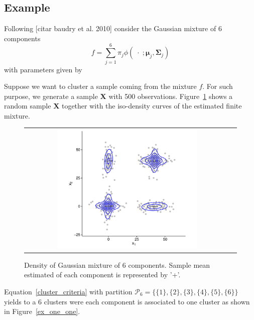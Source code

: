 \documentclass[10pt, a4paper]{article}
\newcommand{\m}[1]{\boldsymbol{#1}}
\begin{document}
\begin{spacing}{1.9}
\subsection{Example} \label{example}

Following [citar baudry et al. 2010] consider the Gaussian mixture of 6 components
\[
f= \sum_{j=1}^6 \pi_j \phi(\;\cdot\; ;  \m\mu_j, \m\Sigma_j)
\]
with parameters given by
{\small  }

Suppose we want to cluster a sample coming from the mixture $f$. For such purpose, we generate a sample \textbf{X} with 500 observations. Figure~\ref{ex_mixture} shows a random sample \textbf{X} together with the iso-density curves of the estimated finite mixture.

\begin{figure}[thbp]
\begin{center}
\begin{tabular}{cc}
  \includegraphics[width=0.7\textwidth]{figures/partition-example-mixture.pdf} \\
 \end{tabular}
 \caption{Density of Gaussian mixture of 6 components. Sample mean estimated of each component is represented by '+'.}\label{ex_mixture}
\end{center}
\end{figure}

Equation~\ref{cluster_criteria} with partition $\mathcal{P}_6 = \{ \{1\},\{2\}, \{3\}, \{4\}, \{5\}, \{6\} \}$ yields to a 6 clusters were each component is associated to one cluster as shown in Figure~\ref{ex_one_one}.


\end{spacing}
\end{document}
